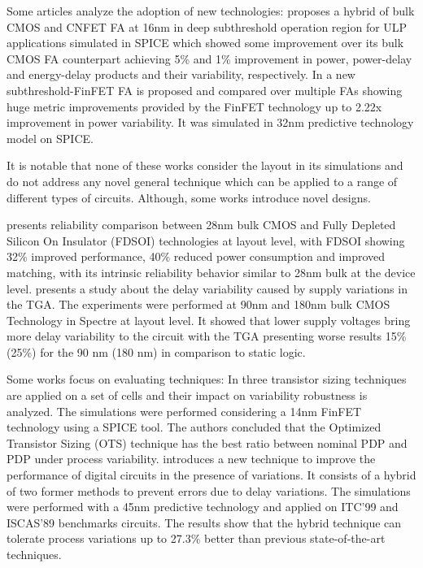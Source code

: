 \documentclass[diss,pgmicro,english]{iiufrgs}
\begin{document}
Some articles analyze the adoption of new technologies: \cite{guduri2015design} proposes a hybrid of bulk CMOS and CNFET FA at 16nm in deep subthreshold operation region for ULP applications simulated in SPICE which showed some improvement over its bulk CMOS FA counterpart achieving 5\% and 1\% improvement in power, power-delay and energy-delay products and their variability, respectively. In \cite{islam2011variability} a new subthreshold-FinFET FA is proposed and compared over multiple FAs showing huge metric improvements provided by the FinFET technology up to 2.22x improvement in power variability. It was simulated in 32nm predictive technology model on SPICE.

It is notable that none of these works consider the layout in its simulations and do not address any novel general technique which can be applied to a range of different types of circuits. Although, some works introduce novel designs.

\cite{federspiel201228nm} presents reliability comparison between 28nm bulk CMOS and Fully Depleted Silicon On Insulator (FDSOI) technologies at layout level, with FDSOI showing 32\% improved performance, 40\% reduced power consumption and improved matching, with its intrinsic reliability behavior similar to 28nm bulk at the device level. \cite{alioto2007delay} presents a study about the delay variability caused by supply variations in the TGA. The experiments were performed at 90nm and 180nm bulk CMOS Technology in Spectre at layout level. It showed that lower supply voltages bring more delay variability to the circuit with the TGA presenting worse results 15\% (25\%) for the 90 nm (180 nm) in comparison to static logic.


Some works focus on evaluating techniques: In \cite{zimpeck2016} three transistor sizing techniques are applied on a set of cells and their impact on variability robustness is analyzed. The simulations were performed considering a 14nm FinFET technology using a SPICE tool. The authors concluded that the Optimized Transistor Sizing (OTS) technique has the best ratio between nominal PDP and PDP under process variability. \cite{ahmadi2017hybrid} introduces a new technique to improve the performance of digital circuits in the presence of variations. It consists of a hybrid of two former methods to prevent errors due to delay variations. The simulations were performed with a 45nm predictive technology and applied on ITC’99 and ISCAS’89 benchmarks circuits. The results show that the hybrid technique can tolerate process variations up to 27.3\% better than previous state-of-the-art techniques.
\end{document}
